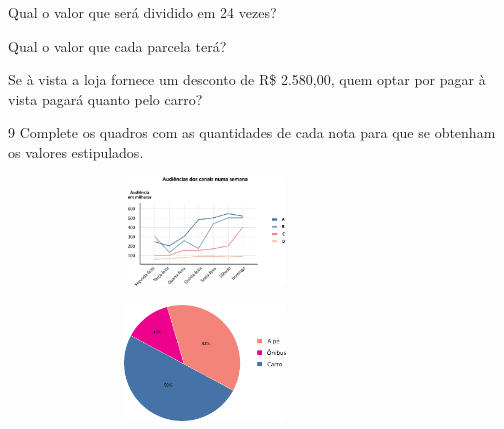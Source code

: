 \begin{escolha}
{%

\begin{escolha}

\item
  Qual o valor que será dividido em 24 vezes?

\item
  Qual o valor que cada parcela terá?

\item
  Se à vista a loja fornece um desconto de R\$ 2.580,00, quem optar por
  pagar à vista pagará quanto pelo carro?
\end{escolha}


\num{9}  Complete os quadros com as quantidades de cada nota para que se
obtenham os valores estipulados.

\begin{escolha}

\item
\includegraphics[width=4.14203in,height=1.14177in]{media/image77.png}


\item
\includegraphics[width=4.10036in,height=1.20844in]{media/image78.png}
\end{escolha}

}
\end{escolha}
